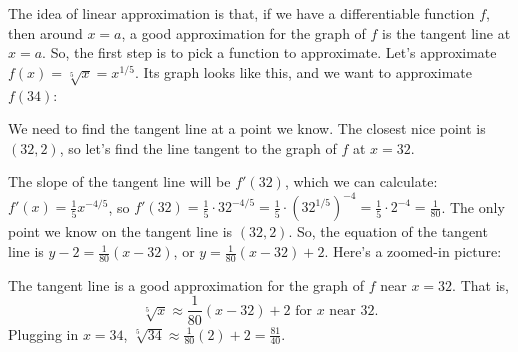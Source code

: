 \documentclass{article}
\theoremstyle{theorem}
\begin{document}
\begin{enumerate}
\begin{enumerate}
    \begin{solution}
      The idea of linear approximation is that, if we have a differentiable function $f$, then around $x = a$, a good approximation for the graph of $f$ is the tangent line at $x = a$. So, the first step is to pick a function to approximate. Let's approximate $f(x) = \sqrt[5]{x} = x^{1/5}$. Its graph looks like this, and we want to approximate $f(34)$:
      \begin{center}
      \end{center}
      We need to find the tangent line at a point we know. The closest nice point is $(32, 2)$, so let's find the line tangent to the graph of $f$ at $x = 32$. 

      The slope of the tangent line will be $f'(32)$, which we can calculate: $f'(x) = \frac{1}{5} x^{-4/5}$, so $f'(32) = \frac{1}{5} \cdot 32^{-4/5} = \frac{1}{5} \cdot \left( 32^{1/5} \right)^{-4} = \frac{1}{5} \cdot 2^{-4} = \frac{1}{80}$. The only point we know on the tangent line is $(32, 2)$. So, the equation of the tangent line is $y - 2 = \frac{1}{80} (x - 32)$, or $y = \frac{1}{80} (x - 32) + 2$. Here's a zoomed-in picture:
      \begin{center}
      \end{center}
      The tangent line is a good approximation for the graph of $f$ near $x = 32$. That is,
      \[ \sqrt[5]{x} \approx \frac{1}{80} (x - 32) + 2 \text{ for $x$ near
        32}.\] Plugging in $x = 34$, $\sqrt[5]{34} \approx \frac{1}{80}
      (2) + 2 = \boxed{\frac{81}{40}}$.
    \end{solution}


\end{enumerate}
\end{enumerate}
\end{document}
